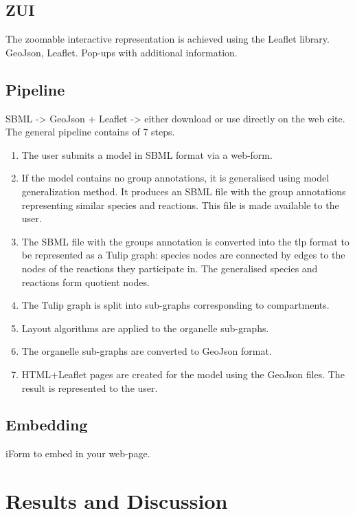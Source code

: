 \documentclass{bmcart}
\begin{document}
\subsection*{ZUI}

The zoomable interactive representation is achieved using the Leaflet library\cite{Agafonkin}.
GeoJson, Leaflet. Pop-ups with additional information.
 
\subsection*{Pipeline}
SBML -> GeoJson + Leaflet -> either download or use directly on the web cite.
The general pipeline contains of 7 steps.
\begin{enumerate}
\item The user submits a model in SBML format via a web-form.
\item If the model contains no group annotations, it is generalised using model generalization method. It produces an SBML file with the group annotations representing similar species and reactions. This file is made available to the user.
\item The SBML file with the groups annotation is converted into the tlp format to be represented as a Tulip graph: species nodes are connected by edges to the nodes of the reactions they participate in. The generalised species and reactions form quotient nodes.
\item The Tulip graph is split into sub-graphs corresponding to compartments.
\item Layout algorithms are applied to the organelle sub-graphs.
\item The organelle sub-graphs are converted to GeoJson format.
\item HTML+Leaflet pages are created for the model using the GeoJson files. The result is represented to the user.
\end{enumerate}

\subsection*{Embedding}
iForm to embed in your web-page.

 
\section*{Results and Discussion}
\end{document}
